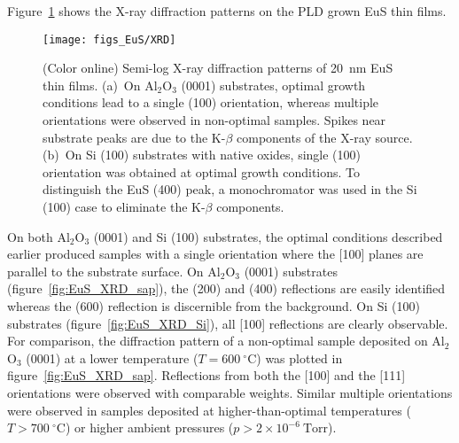 Figure~\ref{fig:EuS_XRD} shows the X-ray diffraction patterns on the PLD grown EuS thin films. %
\begin{figure}[ht]%
    \subfloat{\label{fig:EuS_XRD_sap}}%
    \subfloat{\label{fig:EuS_XRD_Si}}%
    \centering%
    \texttt{[image: figs\_EuS/XRD]}%
    \caption[X-ray diffraction patterns of EuS thin films]{\label{fig:EuS_XRD}(Color online) Semi-log X-ray diffraction patterns of 20~nm EuS thin films. (a)~On Al$_2$O$_3$ (0001) substrates, optimal growth conditions lead to a single (100) orientation, whereas multiple orientations were observed in non-optimal samples. Spikes near substrate peaks are due to the K-$\beta$ components of the X-ray source. (b)~On Si (100) substrates with native oxides, single (100) orientation was obtained at optimal growth conditions. To distinguish the EuS (400) peak, a monochromator was used in the Si (100) case to eliminate the K-$\beta$ components.}%
\end{figure}%
%
On both Al$_2$O$_3$ (0001) and Si (100) substrates, the optimal conditions described earlier produced samples with a single orientation where the [100] planes are parallel to the substrate surface. On Al$_2$O$_3$ (0001) substrates (figure~\ref{fig:EuS_XRD_sap}), the (200) and (400) reflections are easily identified whereas the (600) reflection is discernible from the background. On Si (100) substrates (figure~\ref{fig:EuS_XRD_Si}), all [100] reflections are clearly observable. For comparison, the diffraction pattern of a non-optimal sample deposited on Al$_2$O$_3$ (0001) at a lower temperature ($T=600~^{\circ}\mathrm{C}$) was plotted in figure~\ref{fig:EuS_XRD_sap}. Reflections from both the [100] and the [111] orientations were observed with comparable weights. Similar multiple orientations were observed in samples deposited at higher-than-optimal temperatures ($T>700~^{\circ}\mathrm{C}$) or higher ambient pressures ($p>2\times{}10^{-6}~\mathrm{Torr}$).

